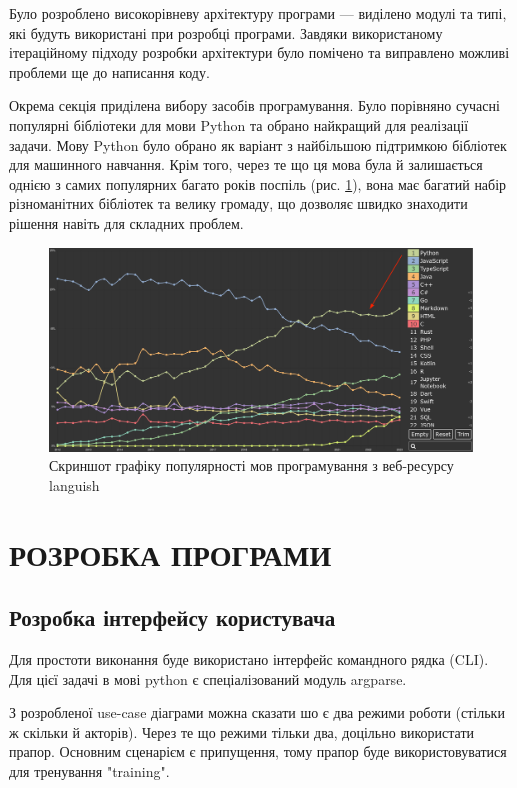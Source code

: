\documentclass[14pt]{extarticle}
\let\oldsection\section
\renewcommand{\section}{\clearpage\oldsection}
\begin{document}
  Було розроблено високорівневу архітектуру програми ---
  виділено модулі та типі, які будуть використані при розробці програми.
  Завдяки використаному ітераційному підходу розробки
  архітектури було помічено та виправлено можливі проблеми ще до написання коду.

  Окрема секція приділена вибору засобів програмування.
  Було порівняно сучасні популярні бібліотеки для мови Python
  та обрано найкращий для реалізації задачи.
  Мову Python було обрано як варіант з найбільшою підтримкою бібліотек
  для машинного навчання. Крім того,
  через те що ця мова була й залишається однією
  з самих популярних багато років поспіль
  \cite{tiobe_index, pypl, github_octoverse2022, languish}
  (рис. \ref{fig:python_languish}),
  вона має багатий набір різноманітних бібліотек та велику громаду,
  що дозволяє швидко знаходити рішення навіть для складних проблем.

  \begin{figure}[H]
    \centering
    \includegraphics[width=\textwidth]{languish_python.png}    
    \caption{Скриншот графіку популярності мов програмування
    з веб-ресурсу languish}
    \label{fig:python_languish}
  \end{figure}

  \section{РОЗРОБКА ПРОГРАМИ}
  \subsection{Розробка інтерфейсу користувача}
  Для простоти виконання буде використано інтерфейс командного рядка (CLI). 
  Для цієї задачі в мові python є спеціалізований модуль argparse.

  З розробленої use-case діаграми можна сказати шо є два режими роботи
  (стільки  ж скільки й акторів).
  Через те що режими тільки два, доцільно використати прапор.
  Основним сценарієм є припущення,
  тому прапор буде використовуватися для тренування "\-\-training".
  
\end{document}
